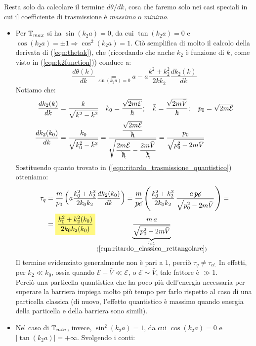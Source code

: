 \documentclass[../../FisicaTeorica.tex]{subfiles}
\begin{document}
Resta solo da calcolare il termine $d\theta/dk$, cosa che faremo solo nei casi speciali in cui il coefficiente di trasmissione è \textit{massimo} o \textit{minimo}.
\begin{itemize}
\item Per $\mathbb{T}_{max}$ si ha $\sin(k_2 a)=0$, da cui $\tan(k_2 a)=0$ e $\cos(k_2 a)=\pm 1\Rightarrow \cos^2(k_2 a)=1$. Ciò semplifica di molto il calcolo della derivata di (\ref{eqn:thetak}), che (ricordando che anche $k_2$ è funzione di $k$, come visto in (\ref{eqn:k2function})) conduce a:
\[
\frac{d\theta(k)}{dk}\underset{\sin(k_2 a)=0}{=}a-a\frac{k^2+k_2^2}{2k k_2}\frac{dk_2(k)}{dk}
\]
Notiamo che:
\begin{align*}
\frac{dk_2(k)}{dk}&=\frac{k}{\sqrt{k^2-\bar{k}^2}} \quad k_0=\frac{\sqrt{2m\mathcal{E}}}{\hbar}; \quad \bar{k}=\frac{\sqrt{2m\bar{V}}}{\hbar}; \quad p_0 = \sqrt{2m\mathcal{E}}\\
\frac{dk_2(k_0)}{dk}&=\frac{k_0}{\sqrt{k_0^2-\bar{k}^2}}=\frac{\displaystyle \frac{\sqrt{2m\mathcal{E}}}{\bcancel{\hbar}}}{\displaystyle \sqrt{\frac{2m\mathcal{E}}{\bcancel{\hbar}}-\frac{2m\bar{V}}{\bcancel{\hbar}}}} = \frac{p_0}{\sqrt{p_0^2-2m\bar{V}}}
\end{align*}
Sostituendo quanto trovato in (\ref{eqn:ritardo_trasmissione_quantistico}) otteniamo:
\begin{align}\nonumber
\tau_q &=\frac{m}{p_0}\left(a\frac{k_0^2+k_2^2}{2k_0k_2} \frac{dk_2(k_0)}{dk}\right) = \frac{m}{\cancel{p_0}}\left(\frac{k_0^2+k_2^2}{2k_0k_2}\,\frac{a\,\cancel{p_0}}{\sqrt{p_0^2-2m\bar{V}}}\right)=\\
&=\hlc{Yellow}{\frac{k_0^2+k_2^2(k_0)}{2k_0 k_2(k_0)}} \underbrace{\frac{m\,a}{\sqrt{p_0^2-2m\bar{V}}}}_{\substack{\tau_{cl.}\\(\ref{eqn:ritardo_classico_rettangolare})}}
\label{eqn:tauq_Tmax}
\end{align}
Il termine evidenziato generalmente non è pari a $1$, perciò $\tau_q \neq \tau_{cl.}$ In effetti, per $k_2 \ll k_0$, ossia quando $\mathcal{E}-\bar{V}\ll\mathcal{E}$, o $\mathcal{E}\sim \bar{V}$, tale fattore è $\gg 1$.\\
Perciò una particella quantistica che ha poco più dell'energia necessaria per superare la barriera impiega molto più tempo per farlo rispetto al caso di una particella classica (di nuovo, l'effetto quantistico è massimo quando energia della particella e della barriera sono simili).
\item Nel caso di $\mathbb{T}_{min}$, invece, $\sin^2(k_2a)=1$, da cui $\cos(k_2a)=0$ e $|\tan(k_2a)|=+\infty$. Svolgendo i conti:

\end{itemize}
\end{document}
